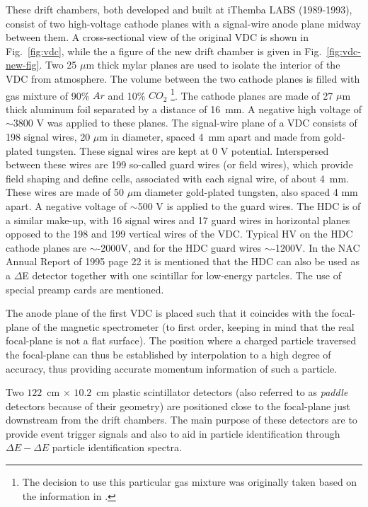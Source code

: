 \documentclass[11pt]{report}
\begin{document}
These drift chambers, both developed and built at iThemba LABS (1989-1993), 
consist of two high-voltage cathode planes with a signal-wire
anode plane midway between them.
A cross-sectional view of the original VDC is shown in Fig.~\ref{fig:vdc}, while the
a figure of the new drift chamber is given in Fig.~\ref{fig:vdc-new-fig}.
Two 25 $\mu$m thick mylar planes are used to isolate the interior 
of the VDC from atmosphere. The volume between the two cathode planes is
filled with gas mixture of 90\% $Ar$ and 10\% $CO_{2}$
\footnote{The decision to use this particular gas mixture was originally taken 
based on the information in \cite{But90}.}.
The cathode planes are made of 27 $%
\mu $m thick aluminum foil separated by a distance of 16~mm. A
negative high voltage of $\sim$3800 V was applied to these planes. 
The signal-wire plane of a VDC consists of 198 signal
wires, 20 $\mu $m in diameter, spaced 4~mm apart and made from gold-plated
tungsten. These signal wires are kept at 0 V potential. Interspersed between
these wires are 199 so-called guard wires (or field wires), which provide field shaping
and define cells, associated with each signal wire, of about 4~mm.
These wires are made of 50 $\mu $m diameter gold-plated tungsten, also spaced 4
mm apart. A negative voltage of $\sim$500 V is applied to the guard wires.
The HDC is of a similar make-up, with 16 signal wires and 17 guard
wires in horizontal planes opposed to the 198 and 199 vertical wires 
of the VDC. Typical HV on the HDC cathode planes are $\sim$-2000V, and 
for the HDC guard wires $\sim$-1200V. In the NAC Annual Report of 1995 page 22 it is
mentioned that the HDC can also be used as a $\Delta$E detector together with one
scintillar for low-energy partcles. The use of special preamp cards are mentioned.

The anode plane of the first VDC is placed such 
that it coincides with the focal-plane of the magnetic spectrometer (to first 
order, keeping in mind that the real focal-plane is not a flat surface).
The position where a charged particle traversed the focal-plane can thus
be established by interpolation to a high degree of accuracy,
thus providing accurate momentum information of such a particle.

Two $122$~cm $\times$ $10.2$~cm  plastic scintillator detectors 
(also referred to as \textit{paddle} detectors because of their geometry)
are positioned close to the focal-plane just downstream from the drift chambers. 
The main purpose of these detectors are to provide event 
trigger signals and also to aid in particle identification
through $\Delta E-\Delta E$ particle identification spectra.
\end{document}
